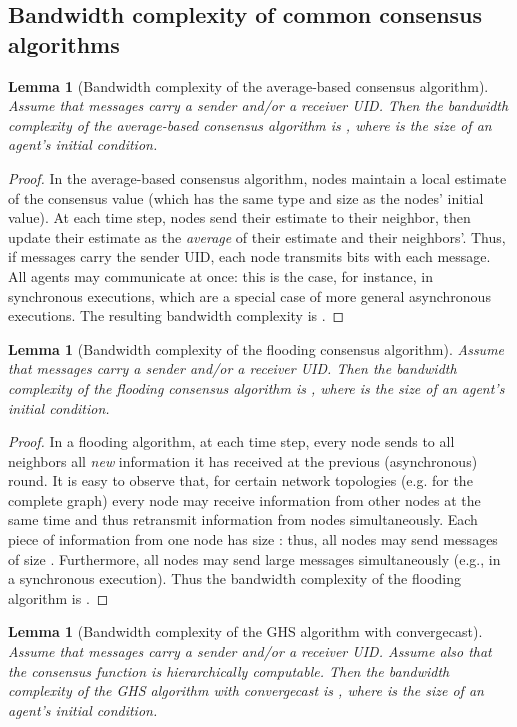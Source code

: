 \documentclass[letterpaper,10pt,conference]{ieeeconf}
\newtheorem{lemma}[theorem]{Lemma}
\begin{document}
\subsection{Bandwidth complexity of common consensus algorithms}
\begin{lemma}[Bandwidth complexity of the average-based consensus algorithm]
\label{prop:avgbased}
Assume that messages carry a sender and/or a receiver UID. Then the bandwidth complexity of the average-based consensus algorithm is , where  is the size of an agent's initial condition.
\end{lemma}
\begin{proof}
In the average-based consensus algorithm, nodes maintain a local estimate of the consensus value (which has the same type and size as the nodes' initial value). At each time step, nodes send their estimate to their neighbor, then update their estimate as the \emph{average} of their estimate and their neighbors'. Thus, if messages carry the sender UID, each node transmits  bits with each message. All agents may communicate at once: this is the case, for instance, in synchronous executions, which are a special case of more general asynchronous executions. The resulting bandwidth complexity is .  
\end{proof}
\begin{lemma}[Bandwidth complexity of the flooding consensus algorithm]
\label{prop:flooding}
Assume that messages carry a sender and/or a receiver UID. Then the bandwidth complexity of the flooding consensus algorithm is , where  is the size of an agent's initial condition.
\end{lemma}
\begin{proof}
In a flooding algorithm, at each time step, every node sends to all neighbors all \emph{new} information it has received at the previous (asynchronous) round. It is easy to observe that, for certain network topologies (e.g. for the complete graph) every node may receive information from  other nodes at the same time and thus retransmit information from  nodes simultaneously. Each piece of information from one node has size : thus, all nodes may send messages of size . Furthermore, all nodes may send large messages simultaneously (e.g., in a synchronous execution). Thus the bandwidth complexity of the flooding algorithm is . 
\end{proof}
\begin{lemma}[Bandwidth complexity of the GHS algorithm with convergecast]
\label{prop:GHSub}
Assume that messages carry a sender and/or a receiver UID. Assume also that the consensus function is hierarchically computable. Then the bandwidth complexity of the GHS algorithm with convergecast is , where  is the size of an agent's initial condition.
\end{lemma}
\end{document}
